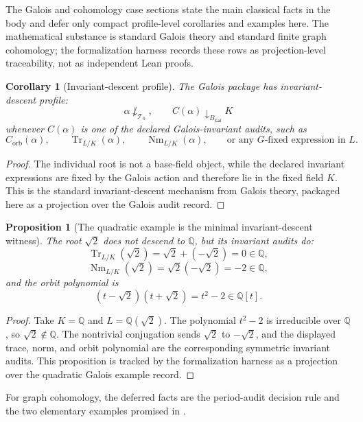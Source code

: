 \documentclass[11pt]{article}
\newcommand{\Galois}{\mathsf{Gal}}
\newcommand{\Tr}{\operatorname{Tr}}
\newcommand{\Nm}{\operatorname{Nm}}
\newtheorem{proposition}[theorem]{Proposition}
\newtheorem{corollary}[theorem]{Corollary}
\theoremstyle{definition}
\begin{document}
The Galois and cohomology case sections state the main classical facts in the
body and defer only compact profile-level corollaries and examples here.  The
mathematical substance is standard Galois theory and standard finite graph
cohomology; the formalization harness records these rows as projection-level
traceability, not as independent Lean proofs.

\begin{corollary}[Invariant-descent profile]
\label{cor:gal-invariant-profile}
The Galois package has invariant-descent profile:
\[
\alpha\not\downarrow_{\mathcal T_0},
\qquad
C(\alpha)\downarrow_{B_{\Galois}} K
\]
whenever \(C(\alpha)\) is one of the declared Galois-invariant audits, such as
\[
C_{\mathrm{orb}}(\alpha),
\qquad
\Tr_{L/K}(\alpha),
\qquad
\Nm_{L/K}(\alpha),
\qquad
\text{or any }G\text{-fixed expression in }L.
\]
\end{corollary}

\begin{proof}
The individual root is not a base-field object, while the declared invariant
expressions are fixed by the Galois action and therefore lie in the fixed field
\(K\).  This is the standard invariant-descent mechanism from Galois theory,
packaged here as a projection over the Galois audit record.
\end{proof}

\begin{proposition}[The quadratic example is the minimal invariant-descent witness]
\label{prop:gal-sqrt2-example}
The root \(\sqrt2\) does not descend to \(\mathbb Q\), but its invariant audits do:
\[
\Tr_{L/K}(\sqrt2)=\sqrt2+(-\sqrt2)=0\in\mathbb Q,
\]
\[
\Nm_{L/K}(\sqrt2)=\sqrt2(-\sqrt2)=-2\in\mathbb Q,
\]
and the orbit polynomial is
\[
(t-\sqrt2)(t+\sqrt2)=t^2-2\in\mathbb Q[t].
\]
\end{proposition}

\begin{proof}
Take \(K=\mathbb Q\) and \(L=\mathbb Q(\sqrt2)\).  The polynomial
\(t^2-2\) is irreducible over \(\mathbb Q\), so \(\sqrt2\notin\mathbb Q\).
The nontrivial conjugation sends \(\sqrt2\) to \(-\sqrt2\), and the displayed
trace, norm, and orbit polynomial are the corresponding symmetric invariant
audits.  This proposition is tracked by the formalization harness as a
projection over the quadratic Galois example record.
\end{proof}

For graph cohomology, the deferred facts are the period-audit decision rule and
the two elementary examples promised in .
\end{document}
